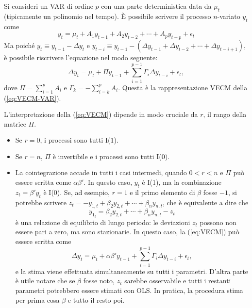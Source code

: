 Si consideri un VAR di ordine $p$ con una parte deterministica data da $\mu_t$
(tipicamente un polinomio nel tempo). È possibile scrivere il processo
$n$-variato $y_t$ come
\begin{equation}
  \label{eq:VECM-VAR}
  y_t = \mu_t + A_1 y_{t-1} + A_2 y_{t-2} + \cdots + A_p y_{t-p} +
  \epsilon_t 
\end{equation}
Ma poiché $y_t \equiv y_{t-1} - \Delta y_t$ e $y_{t-i} \equiv
y_{t-1} - (\Delta y_{t-1} + \Delta y_{t-2} + \cdots + \Delta
y_{t-i+1})$, è possibile riscrivere l'equazione nel modo seguente:
\begin{equation}
  \label{eq:VECM}
  \Delta y_t = \mu_t + \Pi y_{t-1} + \sum_{i=1}^{p-1} \Gamma_i \Delta
  y_{t-i} + \epsilon_t ,
\end{equation}
dove $\Pi = \sum_{i=1}^p A_i$ e $\Gamma_k = -\sum_{i=k}^p A_i$.
Questa è la rappresentazione VECM della (\ref{eq:VECM-VAR}).

L'interpretazione della (\ref{eq:VECM}) dipende in modo cruciale da $r$, il
rango della matrice $\Pi$.
\begin{itemize}
\item Se $r = 0$, i processi sono tutti I(1).
\item Se $r = n$, $\Pi$ è invertibile e i processi sono tutti I(0).
\item La cointegrazione accade in tutti i casi intermedi, quando
  $0 < r < n$ e $\Pi$ può essere scritta come $\alpha \beta'$. In 
  questo caso, $y_t$ è I(1), ma la combinazione $z_t = \beta'y_t$ è I(0).
  Se, ad esempio, $r=1$ e il primo elemento di $\beta$ fosse $-1$, si
  potrebbe scrivere $z_t = -y_{1,t} + \beta_2 y_{2,t} + \cdots + \beta_n y_{n,t}$,
  che è equivalente a dire che
  \[
    y_{1_t} = \beta_2 y_{2,t} + \cdots + \beta_n y_{n,t} - z_t
  \]
  è una relazione di equilibrio di lungo periodo: le deviazioni
  $z_t$ possono non essere pari a zero, ma sono stazionarie. In questo caso,
  la (\ref{eq:VECM}) può essere scritta come
  \begin{equation}
    \label{eq:VECMab}
    \Delta y_t = \mu_t + \alpha \beta' y_{t-1} + \sum_{i=1}^{p-1} \Gamma_i 
    \Delta y_{t-i} + \epsilon_t ,
  \end{equation}
  e la stima viene effettuata simultaneamente su tutti i parametri.
  D'altra parte è utile notare che se $\beta$ fosse noto, $z_t$ sarebbe
  osservabile e tutti i restanti parametri potrebbero essere stimati con OLS. In
  pratica, la procedura stima per prima cosa $\beta$ e tutto il resto poi.
\end{itemize}

